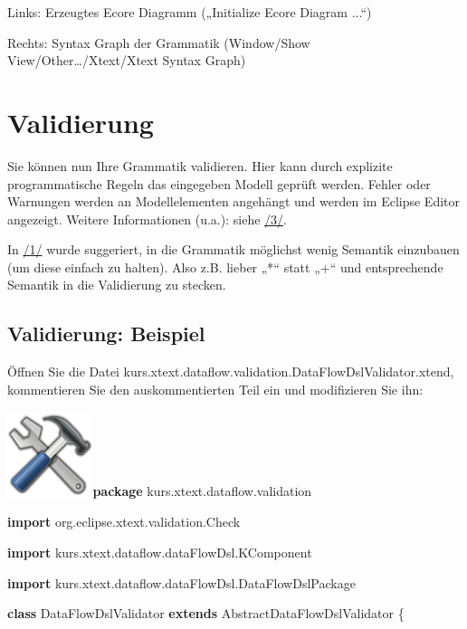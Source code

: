 \documentclass[]{article}
\begin{document}
Links: Erzeugtes Ecore Diagramm („Initialize Ecore Diagram ...``)

Rechts: Syntax Graph der Grammatik (Window/Show
View/Other\ldots{}/Xtext/Xtext Syntax Graph)

\section[Validierung]{\texorpdfstring{\protect\hypertarget{anchor-28}{}{}\protect\hypertarget{anchor-29}{}{}Validierung}{Validierung}}\label{validierung}

Sie können nun Ihre Grammatik validieren. Hier kann durch explizite
programmatische Regeln das eingegeben Modell geprüft werden. Fehler oder
Warnungen werden an Modellelementen angehängt und werden im Eclipse
Editor angezeigt. Weitere Informationen (u.a.): siehe
\protect\hyperlink{anchor-3}{/3/}.

In \protect\hyperlink{anchor-1}{/1/} wurde suggeriert, in die Grammatik
möglichst wenig Semantik einzubauen (um diese einfach zu halten). Also
z.B. lieber „*`` statt „+`` und entsprechende Semantik in die
Validierung zu stecken.

\subsection[Validierung:
Beispiel]{\texorpdfstring{\protect\hypertarget{anchor-30}{}{}\protect\hypertarget{anchor-31}{}{}Validierung:
Beispiel}{Validierung: Beispiel}}\label{validierung-beispiel}

Öffnen Sie die Datei
kurs.xtext.dataflow.validation.DataFlowDslValidator.xtend, kommentieren
Sie den auskommentierten Teil ein und modifizieren Sie ihn:

\includegraphics[width=0.98350in,height=0.98350in]{./Pictures/1000020100000080000000807EA91CDFA7B7F397.png}\textbf{package}
kurs.xtext.dataflow.validation

\textbf{import} org.eclipse.xtext.validation.Check

\textbf{import} kurs.xtext.dataflow.dataFlowDsl.KComponent

\textbf{import} kurs.xtext.dataflow.dataFlowDsl.DataFlowDslPackage

\textbf{class} DataFlowDslValidator \textbf{extends}
AbstractDataFlowDslValidator \{
\end{document}
